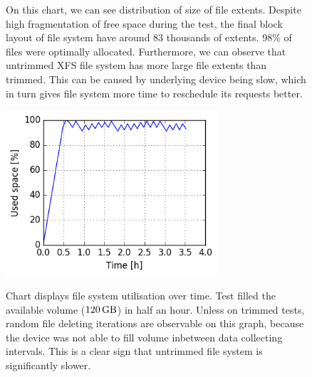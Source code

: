 \documentclass[
  color, %
  table, %
  lof,   %
  lot,   %
]{fithesis3}
\begin{document}
\begin{figure}[h]
    \centering
    \caption[Size distribution of file extents of XFS during testing on SSD without regular trimming]{On this chart, we can see distribution of size of file extents. Despite high fragmentation of free space during the test, the final block layout of file system have around 83 thousands of extents. 98\% of files were optimally allocated. Furthermore, we can observe that untrimmed XFS file system has more large file extents than trimmed. This can be caused by underlying device being slow, which in turn gives file system more time to reschedule its requests better.}
    \label{fig:used_xfs_ssd_notrim}
\end{figure}

\begin{figure}[!h]
    \begin{minipage}{\textwidth}
        \centering
        \includegraphics[width=0.7\textwidth]{../charts/SSD_xfs_notrim/usage.png}
        \caption[Usage of available space of XFS during testing on SSD without regular trimming]{Chart displays file system utilisation over time. Test filled the available volume ($\SI{120}{\giga\byte}$) in half an hour. Unless on trimmed tests, random file deleting iterations are observable on this graph, because the device was not able to fill volume inbetween data collecting intervals. This is a clear sign that untrimmed file system is significantly slower.}
\label{fig:usage_ext4_ssd_notrim}
\label{fig:usage_xfs_ssd_notrim}
    \end{minipage}
\end{figure}
\end{document}
